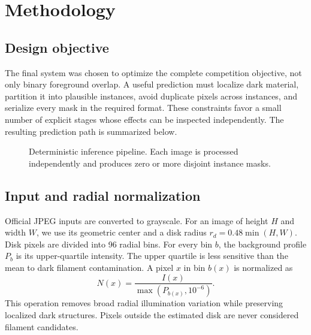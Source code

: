 \documentclass[sigconf]{acmart}
\begin{document}
\section{Methodology}\label{sec:methodology}
\subsection{Design objective}
The final system was chosen to optimize the complete competition objective, not
only binary foreground overlap.  A useful prediction must localize dark material,
partition it into plausible instances, avoid duplicate pixels across instances,
and serialize every mask in the required format.  These constraints favor a
small number of explicit stages whose effects can be inspected independently.
The resulting prediction path is summarized below.

\begin{figure}[h]
\centering
{}
\caption{Deterministic inference pipeline. Each image is processed independently
and produces zero or more disjoint instance masks.}
\label{fig:pipeline}
\end{figure}

\subsection{Input and radial normalization}
Official JPEG inputs are converted to grayscale. For an image of height $H$ and
width $W$, we use its geometric center and a disk radius
$r_d=0.48\min(H,W)$. Disk pixels are divided into 96 radial bins. For every bin
$b$, the background profile $P_b$ is its upper-quartile intensity. The upper
quartile is less sensitive than the mean to dark filament contamination. A
pixel $x$ in bin $b(x)$ is normalized as
\begin{equation}
  N(x)=\frac{I(x)}{\max(P_{b(x)},10^{-6})}.
\end{equation}
This operation removes broad radial illumination variation while preserving
localized dark structures. Pixels outside the estimated disk are never
considered filament candidates.
\end{document}
